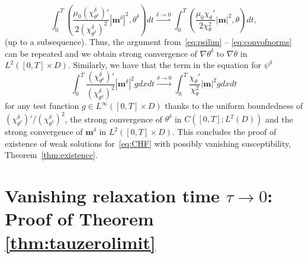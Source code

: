 \documentclass[10pt,letterpaper,twoside]{amsart}
\theoremstyle{definition}{\newtheorem{definition}[lemma]{Definition}}
\theoremstyle{note}{\newtheorem{claim}{Claim}[section]
\newtheorem*{claim*}{Claim}}
\numberwithin{equation}{section}
\newcommand{\dom}{D}
\newcommand{\Grad}{\nabla}
\newcommand{\weak}{\rightharpoonup}
\newcommand{\bm}{\mathbf{m}}
\newcommand{\bmd}{\mathbf{m}^\delta}
\newcommand{\td}{\theta^\delta}
\begin{document}
 \begin{equation*}
 		\int_0^T \left(\frac{\mu_0(\chi_{\td}^\delta)'}{2(\chi_{\td}^\delta)^2}|\bmd|^2,\td\right) dt \stackrel{\delta\to 0}{\weak } 	\int_0^T \left(\frac{\mu_0\chi_{\theta}'}{2\chi_{\theta}^2}|\bm|^2,\theta\right) dt,
 \end{equation*}
 (up to a subsequence). Thus, the argument from~\eqref{eq:psilim} --  \eqref{eq:convofnorms} can be repeated and we obtain strong convergence of $\Grad\td$ to $\Grad\theta$ in $L^2([0,T]\times\dom)$. Similarly, we have that the term in the equation for $\psi^\delta$
  \begin{equation*}
 	\int_0^T  \frac{(\chi_{\td}^\delta)'}{(\chi_{\td}^\delta)^2}|\bmd|^2 g dx dt \stackrel{\delta\to 0}{\longrightarrow} 	\int_0^T  \frac{\chi_{\theta}'}{\chi_{\theta}^2}|\bm|^2 g dx dt
 \end{equation*}
 for any test function $g\in L^\infty([0,T]\times\dom)$ thanks to the uniform boundedness of $(\chi^\delta_{\td})'/(\chi_{\td}^\delta)^2$, the strong convergence of $\td$ in $C([0,T];L^2(\dom))$ and the strong convergence of $\bmd$ in $L^2([0,T]\times\dom)$. This concludes the proof of existence of weak solutions for~\eqref{eq:CHF} with possibly vanishing susceptibility, Theorem~\ref{thm:existence}.

\section{Vanishing relaxation time $\tau\to 0$: Proof of Theorem \ref{thm:tauzerolimit}}\label{sec:relaxation}
\end{document}
